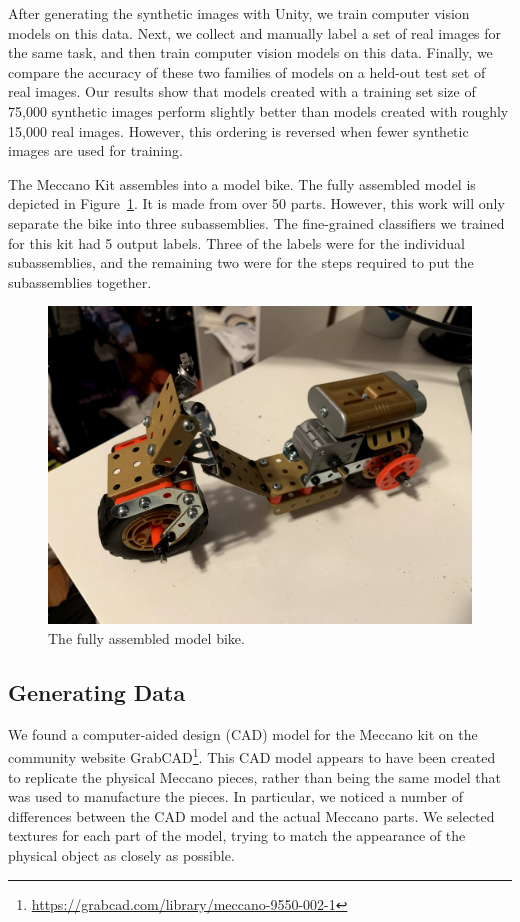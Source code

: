 After generating the synthetic images with Unity, we train
computer vision models on this data.  Next, we  collect and manually
label a set of real images for the same task, and then train computer
vision models on this data.  Finally, we compare the accuracy of these
two families of models on a held-out test set of real images.  Our
results show that models created with a training set size of 75,000
synthetic images perform slightly better than models created with
roughly 15,000 real images.
However, this ordering is reversed when fewer synthetic images are used for
training.

The Meccano Kit assembles into a model bike.
The fully assembled model is depicted in Figure~\ref{fig:full_bike}.
It is made from over 50 parts.
However, this work will only separate the bike into three subassemblies.
The fine-grained classifiers we trained for this kit had 5 output labels.
Three of the labels were for the individual subassemblies, and the remaining two
were for the steps required to put the subassemblies together.

\begin{figure}
  \includegraphics[width=\columnwidth]{figures/synthetic/full_bike.jpg}
  \caption{
    The fully assembled model bike.
  }\label{fig:full_bike}
\end{figure}

\subsection{Generating Data}

We found a computer-aided design (CAD) model for the Meccano kit on the
community website
GrabCAD\footnote{\url{https://grabcad.com/library/meccano-9550-002-1}}.
This CAD model appears to have been created to replicate the physical Meccano
pieces, rather than being the same model that was used to manufacture the
pieces.
In particular, we noticed a number of differences between the CAD model and the
actual Meccano parts.
We selected textures for each part of the model, trying to match the
appearance of the physical object as closely as possible.

